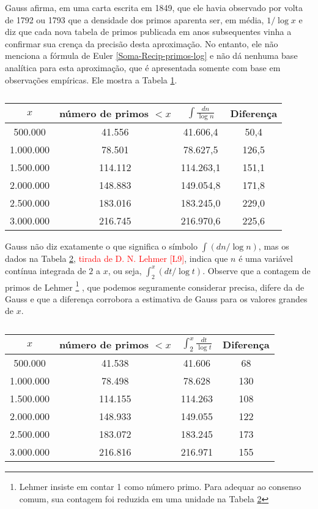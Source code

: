     Gauss afirma, em uma carta escrita em 1849, que ele havia observado por volta de 1792 ou 1793 que a densidade dos primos aparenta ser, em média, $1/\log x$ e diz que cada nova tabela de primos publicada em anos subsequentes vinha a confirmar sua crença da precisão desta aproximação. No entanto, ele não menciona a fórmula de Euler \eqref{Soma-Recip-primos-log} e não dá nenhuma base analítica para esta aproximação, que é apresentada somente com base em observações empíricas. Ele mostra a Tabela \ref{Tabela-Gauss}.
    \begin{table}[H]
        \centering
        \begin{tabular}{cccc}
             $x$& número de primos $< x$ & $\displaystyle \int \frac{dn}{\log n}$ &  Diferença\\
             \hline
             500.000   & 41.556  & 41.606,4  & 50,4 \\
             1.000.000 & 78.501  & 78.627,5  & 126,5 \\
             1.500.000 & 114.112 & 114.263,1 & 151,1 \\
             2.000.000 & 148.883 & 149.054,8 & 171,8 \\
             2.500.000 & 183.016 & 183.245,0 & 229,0 \\
             3.000.000 & 216.745 & 216.970,6 & 225,6
        \end{tabular}
        \caption{}
        \label{Tabela-Gauss}
    \end{table}
    
    Gauss não diz exatamente o que significa o símbolo $\int (dn/\log n)$, mas os dados na Tabela \ref{Tabela-Lehmer}, \textcolor{red}{tirada de D. N. Lehmer [L9]}, indica que $n$ é uma variável contínua integrada de $2$ a $x$, ou seja, $\int_{2}^{x}(dt/\log t)$. Observe que a contagem de primos de Lehmer
    \footnote{Lehmer insiste em contar 1 como número primo. Para adequar ao consenso comum, sua contagem foi reduzida em uma unidade na Tabela \ref{Tabela-Lehmer}}
    , que podemos seguramente considerar precisa, difere da de Gauss e que a diferença corrobora a estimativa de Gauss para os valores grandes de $x$.
    
    \begin{table}[H]
        \centering
        \begin{tabular}{cccc}
             $x$& número de primos $< x$ & $\displaystyle \int_{2}^{x} \frac{dt}{\log t}$ &  Diferença\\
             \hline
             500.000   & 41.538  & 41.606  & 68  \\
             1.000.000 & 78.498  & 78.628  & 130 \\
             1.500.000 & 114.155 & 114.263 & 108 \\
             2.000.000 & 148.933 & 149.055 & 122 \\
             2.500.000 & 183.072 & 183.245 & 173 \\
             3.000.000 & 216.816 & 216.971 & 155
        \end{tabular}
        \caption{}
        \label{Tabela-Lehmer}
    \end{table}
    

